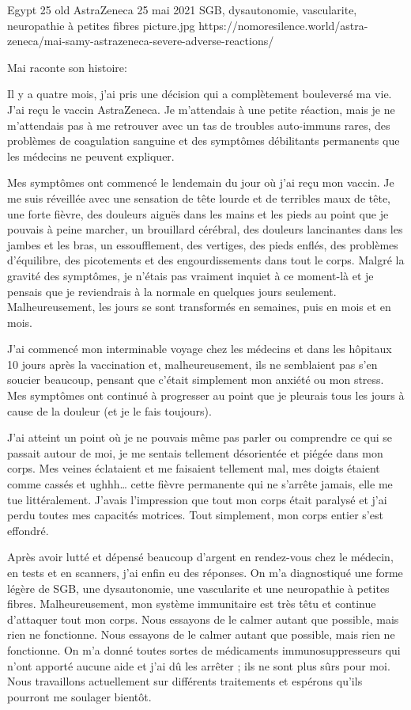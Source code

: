{Egypt}
{25 old}
{AstraZeneca}
{25 mai 2021}
{SGB, dysautonomie, vascularite, neuropathie à petites fibres}
{picture.jpg}
{https://nomoresilence.world/astra-zeneca/mai-samy-astrazeneca-severe-adverse-reactions/}
{

Mai raconte son histoire:

Il y a quatre mois, j'ai pris une décision qui a complètement bouleversé ma
vie. J'ai reçu le vaccin AstraZeneca. Je m'attendais à une petite réaction, mais
je ne m'attendais pas à me retrouver avec un tas de troubles auto-immuns rares,
des problèmes de coagulation sanguine et des symptômes débilitants permanents
que les médecins ne peuvent expliquer.

Mes symptômes ont commencé le lendemain du jour où j'ai reçu mon vaccin. Je me
suis réveillée avec une sensation de tête lourde et de terribles maux de tête,
une forte fièvre, des douleurs aiguës dans les mains et les pieds au point que
je pouvais à peine marcher, un brouillard cérébral, des douleurs lancinantes
dans les jambes et les bras, un essoufflement, des vertiges, des pieds enflés,
des problèmes d'équilibre, des picotements et des engourdissements dans tout le
corps. Malgré la gravité des symptômes, je n'étais pas vraiment inquiet à ce
moment-là et je pensais que je reviendrais à la normale en quelques jours
seulement. Malheureusement, les jours se sont transformés en semaines, puis en
mois et en mois.

J'ai commencé mon interminable voyage chez les médecins et dans les hôpitaux 10
jours après la vaccination et, malheureusement, ils ne semblaient pas s'en
soucier beaucoup, pensant que c'était simplement mon anxiété ou mon stress. Mes
symptômes ont continué à progresser au point que je pleurais tous les jours à
cause de la douleur (et je le fais toujours).

J'ai atteint un point où je ne pouvais même pas parler ou comprendre ce qui se
passait autour de moi, je me sentais tellement désorientée et piégée dans mon
corps. Mes veines éclataient et me faisaient tellement mal, mes doigts étaient
comme cassés et ughhh… cette fièvre permanente qui ne s'arrête jamais, elle me
tue littéralement. J'avais l'impression que tout mon corps était paralysé et
j'ai perdu toutes mes capacités motrices. Tout simplement, mon corps entier
s'est effondré.

Après avoir lutté et dépensé beaucoup d'argent en rendez-vous chez le médecin,
en tests et en scanners, j'ai enfin eu des réponses. On m'a diagnostiqué une
forme légère de SGB, une dysautonomie, une vascularite et une neuropathie à
petites fibres. Malheureusement, mon système immunitaire est très têtu et
continue d'attaquer tout mon corps. Nous essayons de le calmer autant que
possible, mais rien ne fonctionne. Nous essayons de le calmer autant que
possible, mais rien ne fonctionne. On m'a donné toutes sortes de médicaments
immunosuppresseurs qui n'ont apporté aucune aide et j'ai dû les arrêter ; ils ne
sont plus sûrs pour moi. Nous travaillons actuellement sur différents
traitements et espérons qu'ils pourront me soulager bientôt.

}
